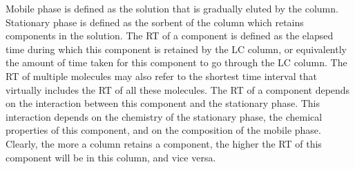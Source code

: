 Mobile phase is defined as the solution that is gradually eluted by the column.
Stationary phase is defined as the sorbent of the column which retains components in the solution. 
The \gls{RT} of a component is defined as the elapsed time during which this component is retained by the \gls{LC} column,
	or equivalently the amount of time taken for this component to go through the \gls{LC} column.
The \gls{RT} of multiple molecules may also refer to the shortest time interval that virtually includes the \gls{RT} of all these molecules. 
The \gls{RT} of a component depends on the interaction between this component and the stationary phase.
This interaction depends on the chemistry of the stationary phase, the chemical properties of this component, and on the composition of the mobile phase. 
Clearly, the more a column retains a component, the higher the \gls{RT} of this component will be in this column, and vice versa. 


